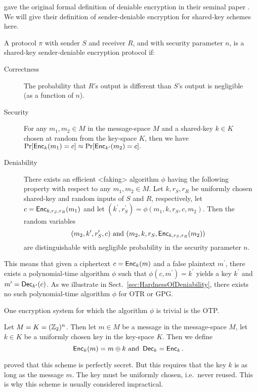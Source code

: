 \citeauthor{deniablecrypt} gave the original formal definition of deniable 
encryption in their seminal paper \cite{deniablecrypt}.
We will give their definition of sender-deniable encryption for shared-key 
schemes here.
\begin{definition}
  \label{def:DeniableEnc}
  A protocol \(\pi\) with sender \(S\) and receiver \(R\), and with security 
  parameter \(n\), is a shared-key sender-deniable encryption protocol if:
  \begin{description}
    \item[Correctness] The probability that \(R\)'s output is different than 
      \(S\)'s output is negligible (as a function of \(n\)).

    \item[Security] For any \(m_1, m_2\in M\) in the message-space \(M\) and 
      a shared-key \(k\in K\) chosen at random from the key-space \(K\), then 
      we have \(\Pr[ \operatorname{\mathsf{Enc}}_k( m_1 ) = c ] \approx \Pr[ \operatorname{\mathsf{Enc}}_{k^\prime}( m_2 
      ) = c ].\)

    \item[Deniability] There exists an efficient <faking> algorithm \(\phi\) 
      having the following property with respect to any \(m_1, m_2\in M.\)
      Let \(k, r_S, r_R\) be uniformly chosen shared-key and random inputs of 
      \(S\) and \(R\), respectively, let \(c = \operatorname{\mathsf{Enc}}_{k, r_S, r_R}( m_1 )\) and 
      let \((k^\prime, r_S^\prime) = \phi( m_1, k, r_S, c, m_2 ).\)
      Then the random variables \[
        ( m_2, k^\prime, r_S^\prime, c ) \text{ and }
        ( m_2, k, r_S, \operatorname{\mathsf{Enc}}_{k, r_S, r_R}( m_2 ) )
      \] are distinguishable with negligible probability in the security 
      parameter \(n\).
  \end{description}
\end{definition}
This means that given a ciphertext \(c = \operatorname{\mathsf{Enc}}_k( m )\) and a false plaintext 
\(m^\prime\), there exists a polynomial-time algorithm \(\phi\) such that 
\(\phi( c, m^\prime ) = k^\prime\) yields a key \(k^\prime\) and \(m^\prime 
= \operatorname{\mathsf{Dec}}_{k^\prime}( c )\).
As we illustrate in Sect.~\ref{sec:HardnessOfDeniability}, there exists no such 
polynomial-time algorithm \(\phi\) for \ac{OTR} or \ac{GPG}.

One encryption system for which the algorithm \(\phi\) is trivial is the 
\ac{OTP}.
\begin{definition}
  \label{def:OTP}
  Let \(M = K = (\mathbb Z_2)^n\).
  Then let \(m\in M\) be a message in the message-space \(M\), let \(k\in K\) 
  be a uniformly chosen key in the key-space \(K\).
  Then we define \[
    \operatorname{\mathsf{Enc}}_k( m ) = m\oplus k \text{ and } \operatorname{\mathsf{Dec}}_k = \operatorname{\mathsf{Enc}}_k.
  \]
\end{definition}
\citet{ShannonSecrecy} proved that this scheme is perfectly secret.
But this requires that the key \(k\) is as long as the message \(m\).
The key must be uniformly chosen, i.e.~never reused.
This is why this scheme is usually considered impractical.

